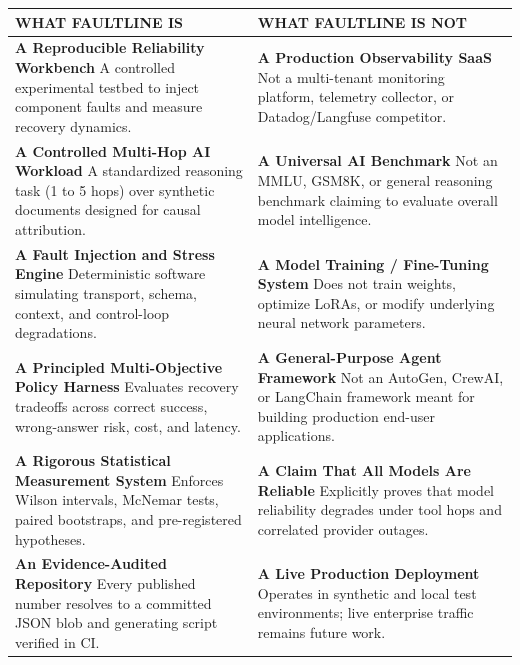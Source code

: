 \begin{center}
\small
\begin{tabularx}{\textwidth}{>{\raggedright\arraybackslash}X|>{\raggedright\arraybackslash}X}
\toprule
\textbf{\large\color{primary}WHAT FAULTLINE IS} & \textbf{\large\color{accent}WHAT FAULTLINE IS NOT} \\
\midrule
\textbf{A Reproducible Reliability Workbench} \newline
A controlled experimental testbed to inject component faults and measure recovery dynamics. & 
\textbf{A Production Observability SaaS} \newline
Not a multi-tenant monitoring platform, telemetry collector, or Datadog/Langfuse competitor. \\
\addlinespace
\textbf{A Controlled Multi-Hop AI Workload} \newline
A standardized reasoning task (1 to 5 hops) over synthetic documents designed for causal attribution. & 
\textbf{A Universal AI Benchmark} \newline
Not an MMLU, GSM8K, or general reasoning benchmark claiming to evaluate overall model intelligence. \\
\addlinespace
\textbf{A Fault Injection and Stress Engine} \newline
Deterministic software simulating transport, schema, context, and control-loop degradations. & 
\textbf{A Model Training / Fine-Tuning System} \newline
Does not train weights, optimize LoRAs, or modify underlying neural network parameters. \\
\addlinespace
\textbf{A Principled Multi-Objective Policy Harness} \newline
Evaluates recovery tradeoffs across correct success, wrong-answer risk, cost, and latency. & 
\textbf{A General-Purpose Agent Framework} \newline
Not an AutoGen, CrewAI, or LangChain framework meant for building production end-user applications. \\
\addlinespace
\textbf{A Rigorous Statistical Measurement System} \newline
Enforces Wilson intervals, McNemar tests, paired bootstraps, and pre-registered hypotheses. & 
\textbf{A Claim That All Models Are Reliable} \newline
Explicitly proves that model reliability degrades under tool hops and correlated provider outages. \\
\addlinespace
\textbf{An Evidence-Audited Repository} \newline
Every published number resolves to a committed JSON blob and generating script verified in CI. & 
\textbf{A Live Production Deployment} \newline
Operates in synthetic and local test environments; live enterprise traffic remains future work. \\
\bottomrule
\end{tabularx}
\end{center}

